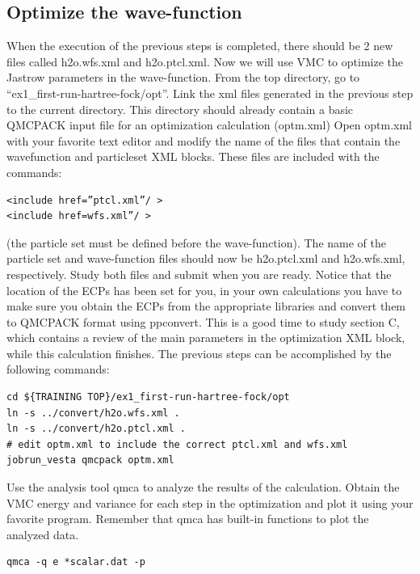 \subsection{Optimize the wave-function}
When the execution of the previous steps is completed, there should be 2 new
files called h2o.wfs.xml and h2o.ptcl.xml. Now we will use VMC to optimize the 
Jastrow parameters in the wave-function.  From the top directory, go to
``ex1\_first-run-hartree-fock/opt''. Link the xml files generated in the previous step
to the current directory. This directory should already contain a basic QMCPACK input
file for an optimization calculation (optm.xml) %
Open optm.xml with your favorite text editor and modify the name of the files that contain the
wavefunction and particleset XML blocks. These files are included with the commands:
\begin{shaded}
\begin{verbatim}
<include href=”ptcl.xml”/ >
<include href=wfs.xml”/ >
\end{verbatim}
\end{shaded}
(the particle set must be
defined before the wave-function). The name of the particle set and wave-function files should now be h2o.ptcl.xml
and h2o.wfs.xml, respectively. Study both files and submit when you are ready. Notice that the
location of the ECPs has been set for you, in your own calculations you have to make
sure you obtain the ECPs from the appropriate libraries and convert them to QMCPACK
format using ppconvert. This is a good time to study section C, which contains a review
of the main parameters in the optimization XML block, while this calculation finishes. The
previous steps can be accomplished by the following commands:
\begin{shaded}
\begin{verbatim}
cd ${TRAINING TOP}/ex1_first-run-hartree-fock/opt
ln -s ../convert/h2o.wfs.xml .
ln -s ../convert/h2o.ptcl.xml .
# edit optm.xml to include the correct ptcl.xml and wfs.xml
jobrun_vesta qmcpack optm.xml
\end{verbatim}
\end{shaded}

Use the analysis tool qmca to analyze the results of the calculation. Obtain the VMC
energy and variance for each step in the optimization and plot it using your favorite program.
Remember that qmca has built-in functions to plot the analyzed data.
\begin{shaded}
\begin{verbatim}
qmca -q e *scalar.dat -p
\end{verbatim}
\end{shaded}

